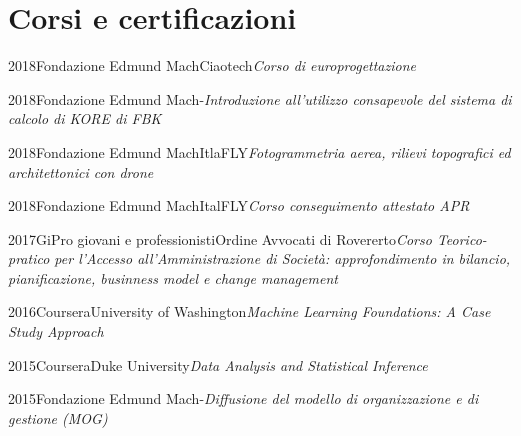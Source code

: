 \documentclass{curriculum}
\begin{document}
    \section{Corsi e certificazioni}
    
    \begin{entrylist}
    \entry
        {2018}{Fondazione Edmund Mach}{Ciaotech}{\emph{Corso di europrogettazione}}
    \end{entrylist}
    
    \begin{entrylist}
    \entry
        {2018}{Fondazione Edmund Mach}{-}{\emph{Introduzione all'utilizzo consapevole del sistema di calcolo di KORE di FBK}}
    \end{entrylist}
    
    \begin{entrylist}
    \entry
        {2018}{Fondazione Edmund Mach}{ItlaFLY}{\emph{Fotogrammetria aerea, rilievi topografici ed architettonici con drone}}
    \end{entrylist}
   
    \begin{entrylist}
    \entry
        {2018}{Fondazione Edmund Mach}{ItalFLY}{\emph{Corso conseguimento attestato APR}}
    \end{entrylist}
    
    \begin{entrylist}
    \entry
        {2017}{GiPro giovani e professionisti}{Ordine Avvocati di Rovererto}{\emph{Corso Teorico-pratico per l'Accesso all'Amministrazione di Società: approfondimento in bilancio, pianificazione, businness model e change management}}
    \end{entrylist} 
    
    \begin{entrylist}
    \entry
        {2016}{Coursera}{University of Washington}{\emph{Machine Learning Foundations: A Case Study Approach}}
    \end{entrylist}
    
    \begin{entrylist}
    \entry
        {2015}{Coursera}{Duke University}{\emph{Data Analysis and Statistical Inference}}
    \end{entrylist}
    
    \begin{entrylist}
    \entry
        {2015}{Fondazione Edmund Mach}{-}{\emph{Diffusione del modello di organizzazione e di gestione (MOG)}}
    \end{entrylist}
    
\end{document}
